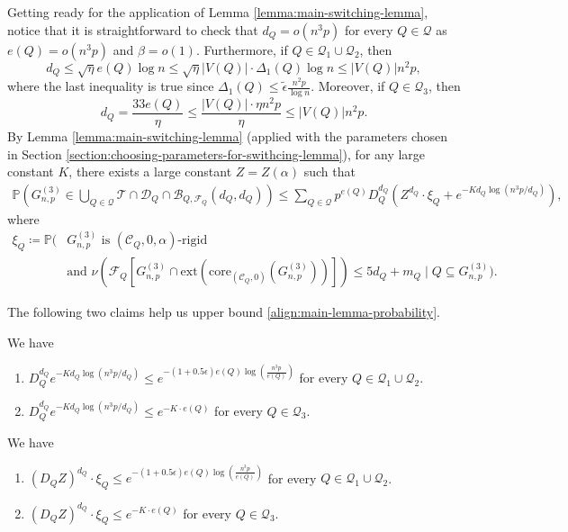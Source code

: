 \documentclass[11pt,a4paper,oneside,reqno]{amsart}
\newcommand{\Gnp}{G_{n, p}^{(3)}}
\newcommand{\cB}{\mathcal{B}}
\newcommand{\cC}{\mathcal{C}}
\newcommand{\cD}{\mathcal{D}}
\newcommand{\cF}{\mathcal{F}}
\newcommand{\cQ}{\mathcal{Q}}
\newcommand{\cT}{\mathcal{T}}
\renewcommand{\Pr}{\mathbb{P}}
\newcommand{\1}{\mathbbm{1}} %
\renewcommand{\le}{\leqslant}
\newcommand{\ext}{\mathrm{ext}}
\newcommand{\core}{\mathrm{core}}
\begin{document}
Getting ready for the application of Lemma \ref{lemma:main-switching-lemma}, notice that it is straightforward to check that $d_Q = o(n^3 p)$ for every $Q \in \cQ$ as $e(Q) = o(n^3 p)$ and $\beta = o(1)$. Furthermore, if $Q \in \cQ_1 \cup \cQ_2$, then
    \[
        d_Q \le \sqrt{\eta} e(Q) \log n \le \sqrt{\eta} |V(Q)| \cdot \Delta_1(Q) \log n \le |V(Q)| n^2 p,
    \]
    where the last inequality is true since $\Delta_1(Q) \le \tilde{\epsilon} \frac{n^2 p}{\log n}$. Moreover, if $Q \in \cQ_3$, then
    \[
        d_Q = \frac{33e(Q)}{\eta} \le \frac{|V(Q)| \cdot \eta n^2 p}{\eta} \le |V(Q)| n^2 p.
    \]
By Lemma \ref{lemma:main-switching-lemma} (applied with the parameters chosen in Section \ref{section:choosing-parameters-for-swithcing-lemma}), for any large constant $K$, there exists a large constant $Z = Z(\alpha)$ such that
\begin{align}\label{align:main-lemma-probability}
    \Pr\left(\Gnp \in \bigcup_{Q \in \cQ} \cT \cap \cD_Q \cap \cB_{Q, \cF_Q}(d_Q, d_Q)\right) \le \sum_{Q \in \cQ} p^{e(Q)} D_Q^{d_Q}\left(Z^{d_Q} \cdot \xi_Q + e^{-K d_Q \log(n^3 p / d_Q)}\right),
\end{align}
where
\begin{align*}
    \xi_Q \coloneqq \Pr\Bigg( &\Gnp \text{ is $(\cC_Q, 0, \alpha)$-rigid} \\
    &\text{and } \nu\left(\cF_Q\left[\Gnp \cap \ext\left(\core_{(\cC_Q, 0)}\left(\Gnp\right)\right)\right]\right) \le 5d_Q + m_Q \;\Bigg|\; Q \subseteq \Gnp \Bigg).
\end{align*}

The following two claims help us upper bound \eqref{align:main-lemma-probability}.
\begin{claim}\label{claim:estimation-of-D_Q K}
    We have
    \begin{enumerate}[topsep=0pt, parsep=0pt]
        \item $D_Q^{d_Q} e^{-K d_Q \log(n^3 p / d_Q)} \le e^{-(1+0.5\epsilon) e(Q) \log\left(\frac{n^3 p}{e(Q)}\right)}$ for every $Q \in \cQ_1 \cup \cQ_2$.
        \item $D_Q^{d_Q} e^{-K d_Q \log(n^3 p / d_Q)} \le e^{-K \cdot e(Q)}$ for every $Q \in \cQ_3$.
    \end{enumerate}
\end{claim}

\begin{claim}\label{claim:estimation-of-xi_Q}
    We have
    \begin{enumerate}[topsep=0pt, parsep=0pt]
        \item $(D_Q Z)^{d_Q} \cdot \xi_Q \le e^{-(1+0.5\epsilon) e(Q) \log\left(\frac{n^3 p}{e(Q)}\right)}$ for every $Q \in \cQ_1 \cup \cQ_2$.
        \item $(D_Q Z)^{d_Q} \cdot \xi_Q \le e^{-K \cdot e(Q)}$ for every $Q \in \cQ_3$.
    \end{enumerate}
\end{claim}
\end{document}
